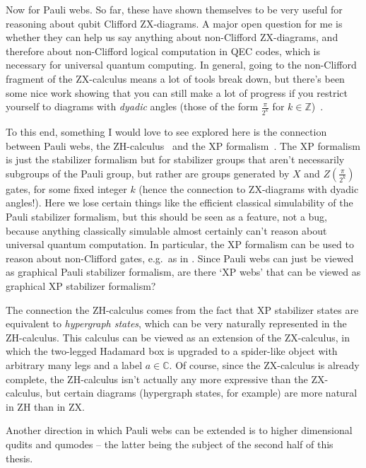 Now for Pauli webs.
So far, these have shown themselves to be very useful for reasoning about qubit Clifford ZX-diagrams.
A major open question for me is whether they can help us say anything about non-Clifford ZX-diagrams, and therefore about non-Clifford logical computation in QEC codes, which is necessary for universal quantum computing.
In general, going to the non-Clifford fragment of the ZX-calculus means a lot of tools break down, but there's been some nice work showing that you can still make a lot of progress if you restrict yourself to diagrams with \textit{dyadic} angles (those of the form $\frac{\pi}{2^k}$ for $k \in \mathbb{Z}$)~\cite{Kissinger_2024,KissingerWetering2024Book}.

To this end, something I would love to see explored here is the connection between Pauli webs, the ZH-calculus~\cite{Backens_2019} and the XP formalism~\cite{Webster_2022}.
The XP formalism is just the stabilizer formalism but for stabilizer groups that aren't necessarily subgroups of the Pauli group, but rather are groups generated by $X$ and $Z(\frac{\pi}{2^k})$ gates, for some fixed integer $k$ (hence the connection to ZX-diagrams with dyadic angles!).
Here we lose certain things like the efficient classical simulability of the Pauli stabilizer formalism, but this should be seen as a feature, not a bug, because anything classically simulable almost certainly can't reason about universal quantum computation.
In particular, the XP formalism can be used to reason about non-Clifford gates, e.g.\ as in .
Since Pauli webs can just be viewed as graphical Pauli stabilizer formalism, are there `XP webs' that can be viewed as graphical XP stabilizer formalism?

The connection the ZH-calculus comes from the fact that XP stabilizer states are equivalent to \textit{hypergraph states}, which can be very naturally represented in the ZH-calculus.
This calculus can be viewed as an extension of the ZX-calculus, in which the two-legged Hadamard box is upgraded to a spider-like object with arbitrary many legs and a label $a \in \mathbb{C}$.
Of course, since the ZX-calculus is already complete, the ZH-calculus isn't actually any more expressive than the ZX-calculus, but certain diagrams (hypergraph states, for example) are more natural in ZH than in ZX.

Another direction in which Pauli webs can be extended is to higher dimensional qudits and qumodes -- the latter being the subject of the second half of this thesis.
